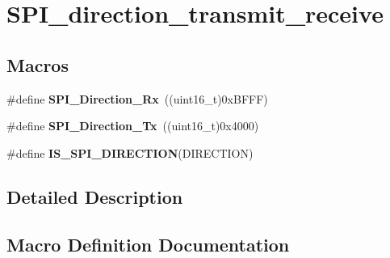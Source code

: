 \hypertarget{group___s_p_i__direction__transmit__receive}{}\section{S\+P\+I\+\_\+direction\+\_\+transmit\+\_\+receive}
\label{group___s_p_i__direction__transmit__receive}
\subsection*{Macros}
\begin{DoxyCompactItemize}
\item 
\hypertarget{group___s_p_i__direction__transmit__receive_ga9a59d225a8cf42eebafbec6ad95c078c}{}\#define {\bfseries S\+P\+I\+\_\+\+Direction\+\_\+\+Rx}~((uint16\+\_\+t)0x\+B\+F\+F\+F)\label{group___s_p_i__direction__transmit__receive_ga9a59d225a8cf42eebafbec6ad95c078c}

\item 
\hypertarget{group___s_p_i__direction__transmit__receive_gabd76982a7e305c13f7ad8ea1789d3c0c}{}\#define {\bfseries S\+P\+I\+\_\+\+Direction\+\_\+\+Tx}~((uint16\+\_\+t)0x4000)\label{group___s_p_i__direction__transmit__receive_gabd76982a7e305c13f7ad8ea1789d3c0c}

\item 
\#define {\bfseries I\+S\+\_\+\+S\+P\+I\+\_\+\+D\+I\+R\+E\+C\+T\+I\+O\+N}(D\+I\+R\+E\+C\+T\+I\+O\+N)
\end{DoxyCompactItemize}


\subsection{Detailed Description}


\subsection{Macro Definition Documentation}
\hypertarget{group___s_p_i__direction__transmit__receive_gae96b69403c4206e347cde77b9a30e207}{}
